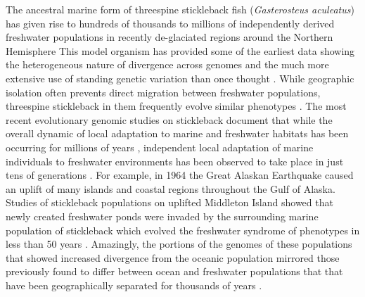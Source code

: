 \documentclass{article}
\begin{document}
The ancestral marine form of threespine stickleback fish (\textit{Gasterosteus aculeatus}) 
has given rise to hundreds of thousands to millions of independently derived freshwater populations 
in recently de-glaciated regions around the Northern Hemisphere 
\citep{Bell_1994, Thompson_1997, Cresko_2007, Hunt_2008} 
This model organism has provided some of the earliest data showing the heterogeneous nature of divergence across genomes 
and the much more extensive use of standing genetic variation than once thought 
\citep{schluter2009genetics, DeFaveri_2011, DeFaveri_2013, Roesti_2014, Nelson_2018, Bassham_2018, Nelson_2019, Hohenlohe_2010, Terekhanova_2014, Marques_2016}.  
While geographic isolation often prevents direct migration between freshwater populations, threespine stickleback in them 
frequently evolve similar phenotypes \citep{Cresko_2004, Colosimo_2004, stuart2017contrasting, hanson2016testing, hanson2017heritable, hirase2014parallel}. 
The most recent evolutionary genomic studies on stickleback document that while the overall dynamic of local adaptation to marine and freshwater habitats has been occurring for millions of years 
\citep{Nelson_2018, Nelson_2019}, independent local adaptation of marine individuals to freshwater environments has been observed to take place in just tens of generations \citep{Terekhanova_2014, Lescak2015evolution, Bassham_2018}. 
For example, in 1964 the Great Alaskan Earthquake caused an uplift of many islands and coastal regions throughout the Gulf of Alaska. 
Studies of stickleback populations on uplifted Middleton Island showed that newly created freshwater ponds were invaded by the surrounding marine population of stickleback which evolved the freshwater syndrome of phenotypes in less than 50 years 
\citep{Lescak2015evolution, Bassham_2018}. 
Amazingly, the portions of the genomes of these populations that showed increased divergence from the oceanic population
mirrored those previously found to differ between ocean and freshwater populations that
that have been geographically separated for thousands of years 
\citep{Hohenlohe_2010, Bassham_2018}. 
\end{document}
